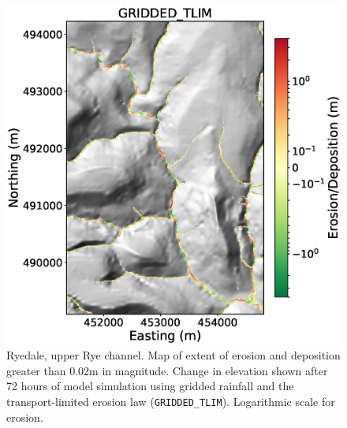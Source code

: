 %

\begin{figure}[htb]
\includegraphics[width=16cm]{chp06_figures_scripts/figure_ryedale_elev_diff_grid_tlim_UPPER.eps}
\caption{Ryedale, upper Rye channel. Map of extent of erosion and deposition greater than 0.02m in magnitude. Change in elevation shown after 72 hours of model simulation using gridded rainfall and the transport-limited erosion law (\texttt{GRIDDED\_TLIM}). Logarithmic scale for erosion.}
\label{fig_ryedale_erodediff_UPPER_gridded_tlim}
\end{figure}

